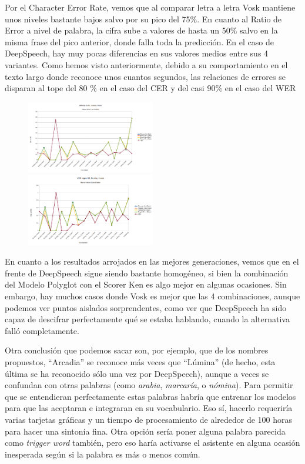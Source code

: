 Por el Character Error Rate, vemos que al comparar letra a letra Vosk mantiene unos niveles bastante bajos salvo por su pico del 75\%. En cuanto al Ratio de Error a nivel de palabra, la cifra sube a valores de hasta un 50\% salvo en la misma frase del pico anterior, donde falla toda la predicción.
En el caso de DeepSpeech, hay muy pocas diferencias en sus valores medios entre sus 4 variantes. Como hemos visto anteriormente, debido a su comportamiento en el texto largo donde reconoce unos cuantos segundos, las relaciones de errores se disparan al tope del 80
\% en el caso del CER y del casi 90\% en el caso del WER

\begin{figure}[H]
	\includegraphics[width=0.5\textwidth]{imagenes/CERMejores.png} \hfill \includegraphics[width=0.5\textwidth]{imagenes/WERMejores.png}
\end{figure}

En cuanto a los resultados arrojados en las mejores generaciones, vemos que en el frente de DeepSpeech sigue siendo bastante homogéneo, si bien la combinación del Modelo Polyglot con el Scorer Ken es algo mejor en algunas ocasiones. Sin embargo, hay muchos casos donde Vosk es mejor que las 4 combinaciones, aunque podemos ver puntos aislados sorprendentes, como ver que DeepSpeech ha sido capaz de descifrar perfectamente qué se estaba hablando, cuando la alternativa falló completamente.

Otra conclusión que podemos sacar son, por ejemplo, que de los nombres propuestos, ``Arcadia'' se reconoce más veces que ``Lúmina'' (de hecho, esta última se ha reconocido sólo una vez por DeepSpeech), aunque a veces se confundan con otras palabras (como \textit{arabia}, \textit{marcaría}, o \textit{nómina}). Para permitir que se entendieran perfectamente estas palabras habría que entrenar los modelos para que las aceptaran e integraran en su vocabulario. Eso sí, hacerlo requeriría varias tarjetas gráficas y un tiempo de procesamiento de alrededor de 100 horas para hacer una sintonía fina. Otra opción sería poner alguna palabra parecida como \textit{trigger word} también, pero eso haría activarse el asistente en alguna ocasión inesperada según si la palabra es más o menos común. 

